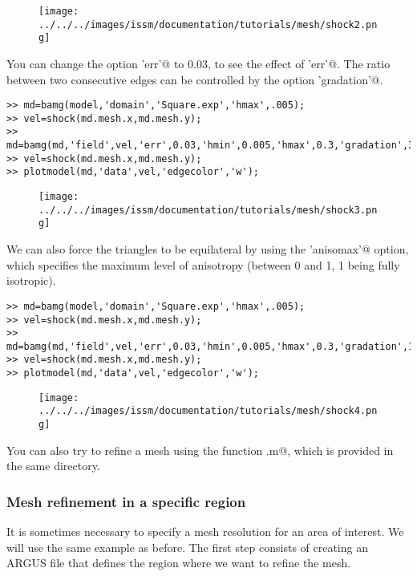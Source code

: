 \begin{figure}[H]
	\begin{center}
		\texttt{[image: ../../../images/issm/documentation/tutorials/mesh/shock2.png]}
	\end{center}
\end{figure}
You can change the option \verb@'err'@ to 0.03, to see the effect of \verb@'err'@. The ratio between two consecutive edges can be controlled by the option \verb@'gradation'@.
\begin{verbatim}>> md=bamg(model,'domain','Square.exp','hmax',.005);
>> vel=shock(md.mesh.x,md.mesh.y);
>> md=bamg(md,'field',vel,'err',0.03,'hmin',0.005,'hmax',0.3,'gradation',3);
>> vel=shock(md.mesh.x,md.mesh.y);
>> plotmodel(md,'data',vel,'edgecolor','w');
\end{verbatim}
\begin{figure}[H]
	\begin{center}
		\texttt{[image: ../../../images/issm/documentation/tutorials/mesh/shock3.png]}
	\end{center}
\end{figure}
We can also force the triangles to be equilateral by using the \verb@'anisomax'@ option, which specifies the maximum level of anisotropy (between 0 and 1, 1 being fully isotropic).
\begin{verbatim}>> md=bamg(model,'domain','Square.exp','hmax',.005);
>> vel=shock(md.mesh.x,md.mesh.y);
>> md=bamg(md,'field',vel,'err',0.03,'hmin',0.005,'hmax',0.3,'gradation',1.3,'anisomax',1);
>> vel=shock(md.mesh.x,md.mesh.y);
>> plotmodel(md,'data',vel,'edgecolor','w');
\end{verbatim}
\begin{figure}[H]
	\begin{center}
		\texttt{[image: ../../../images/issm/documentation/tutorials/mesh/shock4.png]}
	\end{center}
\end{figure}
You can also try to refine a mesh using the function \verb@circles.m@, which is provided in the same directory.
\subsubsection{Mesh refinement in a specific region}%
It is sometimes necessary to specify a mesh resolution for an area of interest. We will use the same example as before. The first step consists of creating an ARGUS file that defines the region where we want to refine the mesh.


